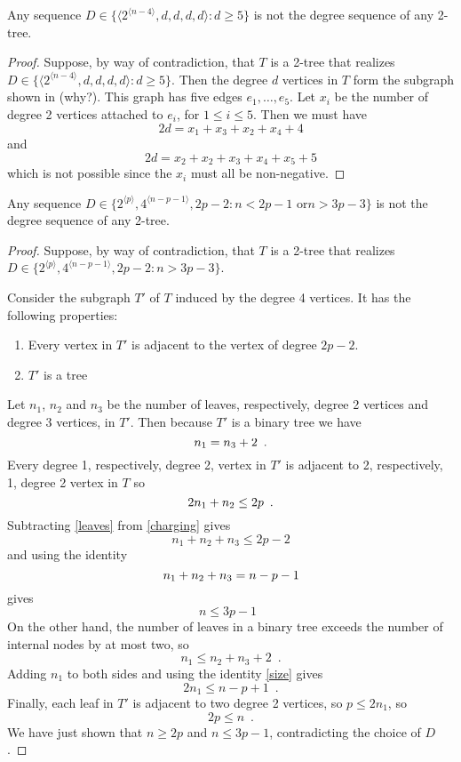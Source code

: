 \documentclass[lotsofwhite,charterfonts]{patmorin}
\newcommand{\rep}[1]{^{\langle#1\rangle}}
\begin{document}
\begin{lem}
Any sequence $D\in\{\langle 2\rep{n-4},d,d,d,d\rangle : d\ge 5\}$ is not 
the degree sequence of any 2-tree.
\end{lem}

\begin{proof}
Suppose, by way of contradiction, that $T$ is a 2-tree that realizes
$D\in\{\langle 2\rep{n-4},d,d,d,d\rangle : d\ge 5\}$.  Then the degree
$d$ vertices in $T$ form the subgraph shown in 
(why?).  This graph has five edges $e_1,\ldots,e_5$.  Let $x_i$ be
the number of degree 2 vertices attached to $e_i$, for $1\le i\le 5$.
Then we must have
\[
   2d = x_1 + x_3 + x_2 + x_4 + 4
\]
and 
\[
   2d = x_2 + x_2 + x_3 + x_4 + x_5 + 5
\]
which is not possible since the $x_i$ must all be non-negative.
\end{proof}


\begin{lem}
Any sequence $D\in\{2\rep{p},4\rep{n-p-1}, 2p-2 : \mbox{$n < 2p-1$ or
$n > 3p-3$} \}$ is not the degree sequence of any 2-tree.
\end{lem}

\begin{proof}
Suppose, by way of contradiction, that $T$ is a 2-tree that realizes
$D\in\{2\rep{p},4\rep{n-p-1}, 2p-2 : n > 3p-3 \}$.

Consider the subgraph $T'$ of $T$ induced by the degree 4 vertices.
It has the following properties:
\begin{enumerate}
\item Every vertex in $T'$ is adjacent to the vertex of degree $2p-2$.
\item $T'$ is a tree
\end{enumerate}

Let $n_1$, $n_2$ and $n_3$ be the number of leaves, respectively, degree 2
vertices and degree 3 vertices, in $T'$.  Then because $T'$ is a
binary tree we have 
\begin{equation}
   n_1=n_3+2 \enspace . \eqlabel{leaves} 
\end{equation}
Every degree 1, respectively, degree 2, vertex in $T'$ is adjacent to
2, respectively, 1, degree 2 vertex in $T$ so
\begin{equation}
   2n_1 + n_2 \le 2p  \enspace . \eqlabel{charging}
\end{equation} 
Subtracting \eqref{leaves} from \eqref{charging} gives
\[
    n_1 + n_2 + n_3 \le 2p-2
\]
and using the identity 
\begin{equation}
     n_1+n_2+n_3 = n-p-1 \eqlabel{size}
\end{equation}
gives
\[
     n \le 3p-1 \enspace 
\]
On the other hand, the number of leaves in a
binary tree exceeds the number of internal nodes by at most two, so 
\[
      n_1 \le n_2 + n_3 + 2 \enspace .
\]
Adding $n_1$ to both sides and using the identity \eqref{size}
gives
\[
     2n_1 \le n-p+1 \enspace .
\]
Finally, each leaf in $T'$ is adjacent to two degree 2 vertices, so
$p\le 2n_1$, so
\[
     2p \le n \enspace .
\]
We have just shown that $n\ge 2p$ and $n\le 3p-1$, contradicting the
choice of $D$.
\end{proof}
\end{document}
